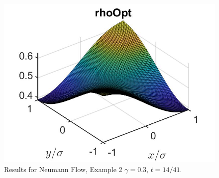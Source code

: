 \documentclass[11pt, a4paper]{article}
\theoremstyle{definition}
\begin{document}
\begin{figure}[h]
	\includegraphics[scale=0.3]{rhoOpt2D3.jpg}
	\caption{Results for Neumann Flow, Example 2 $\gamma = 0.3$, $t = 14/41$.}
	\label{Ex12DN3}
\end{figure}
\end{document}
